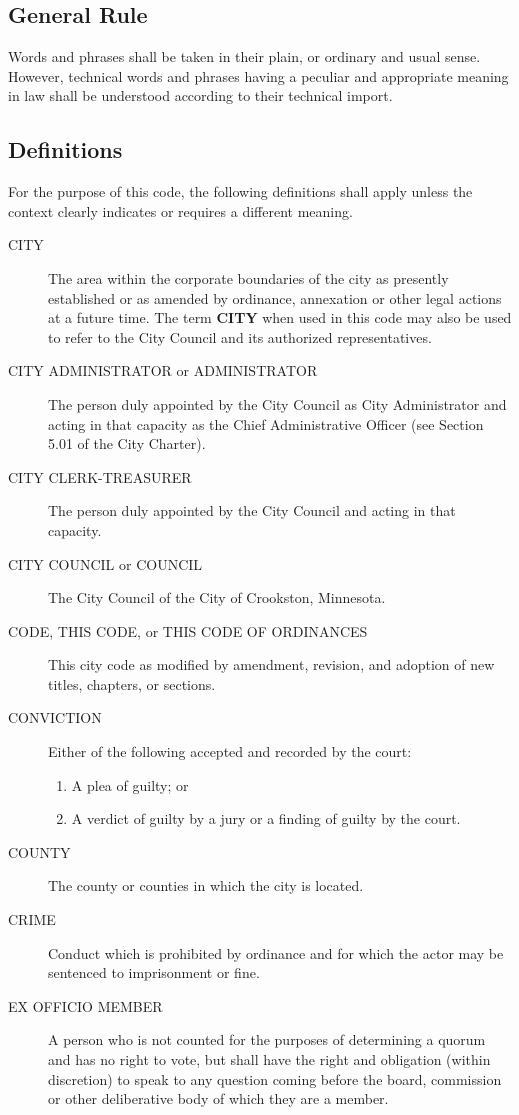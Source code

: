 \subsection{General Rule}
Words and phrases shall be taken in their plain, or ordinary and usual sense.  However, technical words and phrases having a peculiar and appropriate meaning in law shall be understood according to their technical import.
\subsection{Definitions}
For the purpose of this code, the following definitions shall apply unless the context clearly indicates or requires a different meaning.
\begin{description}
\item[CITY] The area within the corporate boundaries of the city as presently established or as amended by ordinance, annexation or other legal actions at a future time.  The term \textbf{CITY} when used in this code may also be used to refer to the City Council and its authorized representatives.
\item[CITY ADMINISTRATOR or ADMINISTRATOR] The person duly appointed by the City Council as City Administrator and acting in that capacity as the Chief Administrative Officer (see Section 5.01 of the City Charter).
\item[CITY CLERK-TREASURER] The person duly appointed by the City Council and acting in that capacity.
\item[CITY COUNCIL or COUNCIL] The City Council of the City of Crookston, Minnesota.
\item[CODE, THIS CODE, or THIS CODE OF ORDINANCES] This city code as modified by amendment, revision, and adoption of new titles, chapters, or sections.
\item[CONVICTION] Either of the following accepted and recorded by the court:
\begin{enumerate}[{\indent}a)]
    \item A plea of guilty; or
    \item A verdict of guilty by a jury or a finding of guilty by the court.
\end{enumerate}
\item[COUNTY] The county or counties in which the city is located.
\item[CRIME] Conduct which is prohibited by ordinance and for which the actor may be sentenced to imprisonment or fine.
\item[EX OFFICIO MEMBER] A person who is not counted for the purposes of determining a quorum and has no right to vote, but shall have the right and obligation (within discretion) to speak to any question coming before the board, commission or other deliberative body of which they are a member.

\end{description}
